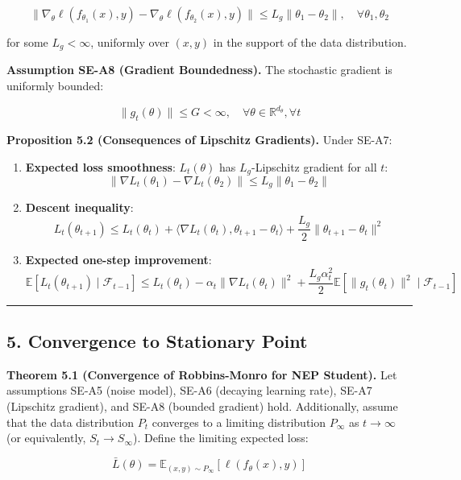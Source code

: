 \documentclass[
  12pt,
]{article}
\begin{document}
\[
\|\nabla_\theta \ell(f_{\theta_1}(x), y) - \nabla_\theta \ell(f_{\theta_2}(x), y)\| \leq L_g \|\theta_1 - \theta_2\|, \quad \forall \theta_1, \theta_2
\]

for some \(L_g < \infty\), uniformly over \((x,y)\) in the support of
the data distribution.

\textbf{Assumption SE-A8 (Gradient Boundedness).} The stochastic
gradient is uniformly bounded:

\[
\|g_t(\theta)\| \leq G < \infty, \quad \forall \theta \in \mathbb{R}^{d_\theta}, \forall t
\]

\textbf{Proposition 5.2 (Consequences of Lipschitz Gradients).} Under
SE-A7:

\begin{enumerate}
\def\labelenumi{\arabic{enumi}.}
\item
  \textbf{Expected loss smoothness}: \(L_t(\theta)\) has
  \(L_g\)-Lipschitz gradient for all \(t\): \[
  \|\nabla L_t(\theta_1) - \nabla L_t(\theta_2)\| \leq L_g \|\theta_1 - \theta_2\|
  \]
\item
  \textbf{Descent inequality}: \[
  L_t(\theta_{t+1}) \leq L_t(\theta_t) + \langle \nabla L_t(\theta_t), \theta_{t+1} - \theta_t \rangle + \frac{L_g}{2} \|\theta_{t+1} - \theta_t\|^2
  \]
\item
  \textbf{Expected one-step improvement}: \[
  \mathbb{E}[L_t(\theta_{t+1}) \mid \mathcal{F}_{t-1}] \leq L_t(\theta_t) - \alpha_t \|\nabla L_t(\theta_t)\|^2 + \frac{L_g \alpha_t^2}{2} \mathbb{E}[\|g_t(\theta_t)\|^2 \mid \mathcal{F}_{t-1}]
  \]
\end{enumerate}

\begin{center}\rule{0.5\linewidth}{0.5pt}\end{center}

\subsection{5. Convergence to Stationary
Point}\label{convergence-to-stationary-point}

\textbf{Theorem 5.1 (Convergence of Robbins-Monro for NEP Student).} Let
assumptions SE-A5 (noise model), SE-A6 (decaying learning rate), SE-A7
(Lipschitz gradient), and SE-A8 (bounded gradient) hold. Additionally,
assume that the data distribution \(P_t\) converges to a limiting
distribution \(P_\infty\) as \(t \to \infty\) (or equivalently,
\(S_t \to S_\infty\)). Define the limiting expected loss:

\[
\bar{L}(\theta) = \mathbb{E}_{(x,y) \sim P_\infty}[\ell(f_\theta(x), y)]
\]
\end{document}
